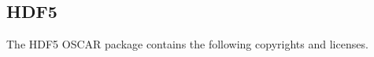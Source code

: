 %
%
% 
% 
% 
% 
%

\subsection{HDF5}

The HDF5 OSCAR package contains the following copyrights and
licenses.

